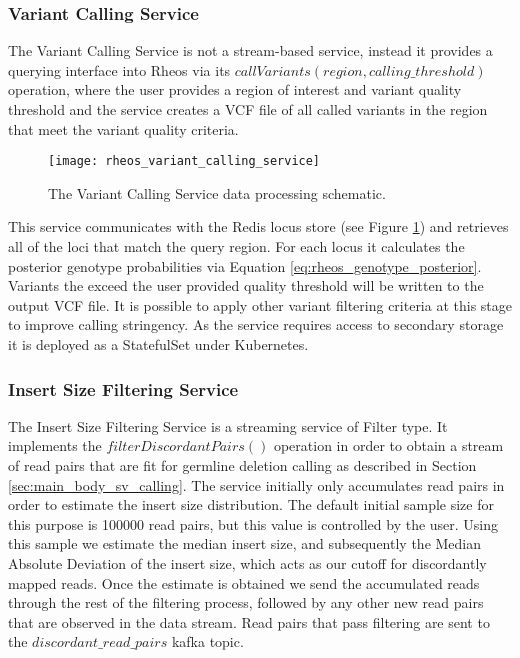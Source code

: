 \subsubsection{Variant Calling Service}

The Variant Calling Service is not a stream-based service, instead it provides a querying interface into Rheos via its $callVariants(region, calling\_threshold)$ operation, where the user provides a region of interest and variant quality threshold and the service creates a VCF file of all called variants in the region that meet the variant quality criteria. 

\begin{figure}[h!]
    \texttt{[image: rheos\_variant\_calling\_service]}
    \centering
    \caption {The Variant Calling Service data processing schematic.}
    \label{fig:rheos_variant_calling_service}
\end{figure}

This service communicates with the Redis locus store (see Figure \ref{fig:rheos_variant_calling_service}) and retrieves all of the loci that match the query region. For each locus it calculates the posterior genotype probabilities via Equation \ref{eq:rheos_genotype_posterior}. Variants the exceed the user provided quality threshold will be written to the output VCF file. It is possible to apply other variant filtering criteria at this stage to improve calling stringency. As the service requires access to secondary storage it is deployed as a StatefulSet under Kubernetes.

\subsubsection{Insert Size Filtering Service}

The Insert Size Filtering Service is a streaming service of Filter type. It implements the $filterDiscordantPairs()$ operation in order to obtain a stream of read pairs that are fit for germline deletion calling as described in Section \ref{sec:main_body_sv_calling}. The service initially only accumulates read pairs in order to estimate the insert size distribution. The default initial sample size for this purpose is 100000 read pairs, but this value is controlled by the user. Using this sample we estimate the median insert size, and subsequently the Median Absolute Deviation of the insert size, which acts as our cutoff for discordantly mapped reads. Once the estimate is obtained we send the accumulated reads through the rest of the filtering process, followed by any other new read pairs that are observed in the data stream. Read pairs that pass filtering are sent to the $discordant\_read\_pairs$ kafka topic. 

